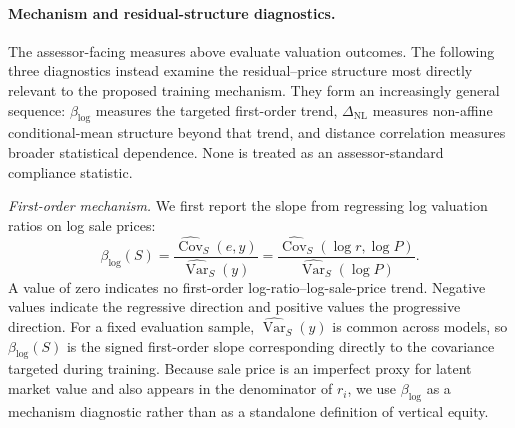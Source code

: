\documentclass[10pt]{article}
\theoremstyle{definition}
\newcommand{\1}{\mathbf{1}}
\newcommand{\oldtext}[1]{\textcolor{blue}{\sout{#1}}}
\newcommand{\newtext}[1]{\textcolor{impGreen}{#1}}
\begin{document}
\paragraph{
\newtext{Mechanism and residual-structure diagnostics.}}
{\color{impGreen}
The assessor-facing measures above evaluate valuation outcomes. The following three
diagnostics instead examine the residual--price structure most directly relevant to
the proposed training mechanism. They form an increasingly general sequence:
$\beta_{\log}$ measures the targeted first-order trend, $\Delta_{\mathrm{NL}}$
measures non-affine conditional-mean structure beyond that trend, and distance
correlation measures broader statistical dependence. None is treated as an
assessor-standard compliance statistic.

\emph{First-order mechanism.}
We first report the slope from regressing log valuation ratios on log sale prices:
\begin{equation}
\label{eq:log_ratio_slope}
\beta_{\log}(S)
=
\frac{
\widehat{\operatorname{Cov}}_S(e,y)
}{
\widehat{\operatorname{Var}}_S(y)
}
=
\frac{
\widehat{\operatorname{Cov}}_S(\log r,\log P)
}{
\widehat{\operatorname{Var}}_S(\log P)
}.
\end{equation}
A value of zero indicates no first-order log-ratio--log-sale-price trend. Negative
values indicate the regressive direction and positive values the progressive
direction. For a fixed evaluation sample, $\widehat{\operatorname{Var}}_S(y)$ is
common across models, so $\beta_{\log}(S)$ is the signed first-order slope
corresponding directly to the covariance targeted during training. Because sale
price is an imperfect proxy for latent market value and also appears in the
denominator of $r_i$, we use $\beta_{\log}$ as a mechanism diagnostic rather than
as a standalone definition of vertical equity.

}
\end{document}
